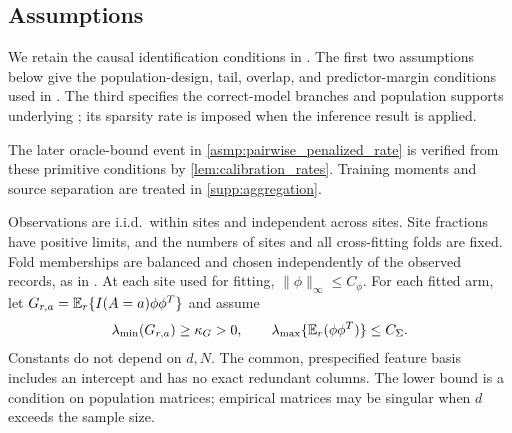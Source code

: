\documentclass[12pt]{article}
\begin{document}
\subsection{Assumptions}\label{supp:pairwise_assumptions}
We retain the causal identification conditions in . The first two assumptions below give the population-design, tail, overlap, and predictor-margin conditions used in . The third specifies the correct-model branches and population supports underlying ; its sparsity rate is imposed when the inference result is applied.

The later oracle-bound event in \cref{asmp:pairwise_penalized_rate} is verified from these primitive conditions by \cref{lem:calibration_rates}. Training moments and source separation are treated in \cref{supp:aggregation}.
\begin{assumption}\label{asmp:pairwise_data}
Observations are i.i.d.\ within sites and independent across sites. Site fractions have positive limits, and the numbers of sites and all cross-fitting folds are fixed. Fold memberships are balanced and chosen independently of the observed records, as in . At each site used for fitting, $\|\phi\|_\infty\le C_\phi$. For each fitted arm, let $G_{r,a}=\mathbb{E}_r\{I(A=a)\phi\phi^T\}$ and assume
\begin{equation}\label{eq:population_design}
\lambda_{\min}(G_{r,a})\ge\kappa_G>0,
\qquad \lambda_{\max}\{\mathbb{E}_r(\phi\phi^T)\}\le C_\Sigma.
\end{equation}
Constants do not depend on $d,N$. The common, prespecified feature basis includes an intercept and has no exact redundant columns. The lower bound is a condition on population matrices; empirical matrices may be singular when $d$ exceeds the sample size.
\end{assumption}
\end{document}
